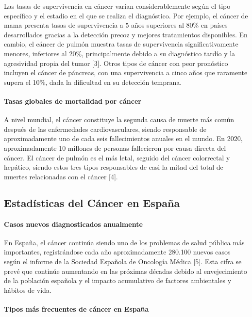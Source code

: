 Las tasas de supervivencia en cáncer varían considerablemente según el tipo específico y el estadio en el que se realiza el diagnóstico. Por ejemplo, el cáncer de mama presenta tasas de supervivencia a 5 años superiores al 80\% en países desarrollados gracias a la detección precoz y mejores tratamientos disponibles. En cambio, el cáncer de pulmón muestra tasas de supervivencia significativamente menores, inferiores al 20\%, principalmente debido a su diagnóstico tardío y la agresividad propia del tumor [3]. Otros tipos de cáncer con peor pronóstico incluyen el cáncer de páncreas, con una supervivencia a cinco años que raramente supera el 10\%, dada la dificultad en su detección temprana. 

\paragraph[short]{Tasas globales de mortalidad por cáncer}

A nivel mundial, el cáncer constituye la segunda causa de muerte más común después de las enfermedades cardiovasculares, siendo responsable de aproximadamente uno de cada seis fallecimientos anuales en el mundo. En 2020, aproximadamente 10 millones de personas fallecieron por causa directa del cáncer. El cáncer de pulmón es el más letal, seguido del cáncer colorrectal y hepático, siendo estos tres tipos responsables de casi la mitad del total de muertes relacionadas con el cáncer [4]. 

\subsection{Estadísticas del Cáncer en España}
\label{sec:stats-cancer-spain}

\paragraph{Casos nuevos diagnosticados anualmente}

En España, el cáncer continúa siendo uno de los problemas de salud pública más importantes, registrándose cada año aproximadamente 280.100 nuevos casos según el informe de la Sociedad Española de Oncología Médica [5]. Esta cifra se prevé que continúe aumentando en las próximas décadas debido al envejecimiento de la población española y el impacto acumulativo de factores ambientales y hábitos de vida. 

\paragraph{Tipos más frecuentes de cáncer en España} 

